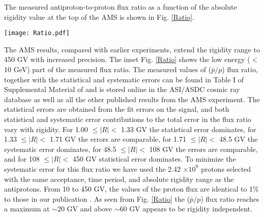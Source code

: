\documentclass[twocolumn,twoside,slac_two]{revtex4-1}
\begin{document}
The measured antiproton-to-proton flux ratio
as a function of the absolute rigidity value at the top of the AMS
is shown in Fig. \ref{Ratio}. 
\begin{figure*}[t]
\centering
\texttt{[image: Ratio.pdf]}
\caption{The measured ($\bar{p}/p$) flux ratio as a function of the
  absolute value of the rigidity from 1 to 450 GV. The PAMELA \cite{ref:PAMELA}
  measurement is also shown (blue open circle).
  In the inset the ($\bar{p}/p$) flux ratio it is shown as a function of the kinetic energy up to 10 GeV.
  The kinetic energy is defined as $E_K = \sqrt{R^2 +M^2}-M$ where M is the antiproton or proton mass.
  The BESS \cite{ref:BESS} and PAMELA \cite{ref:PAMELA} measurements are also shown. For the AMS data, the error bars are
  the quadratic sum of statistical and systematic errors. Horizontally, the data points are placed at
the center of each bin. See \cite{ref:AMS2_pbar}.} \label{Ratio}
\end{figure*}
The AMS results,
compared with earlier experiments,
extend the rigidity range to 450 GV with increased
precision.
The inset Fig. \ref{Ratio} shows the low energy ($<$ 10 GeV) part of the measured flux ratio.
The measured values of ($\bar{p}/p$) flux ratio, together with the statistical and systematic
errors can be found in Table I of Supplemental Material of \cite{ref:AMS2_pbar} and
is stored online in the ASI/ASDC cosmic ray database \cite{ref:ASDC} as well as all
the other published results from the AMS experiment.
%
The statistical errors are obtained from the fit errors on the signal, and
both statistical and systematic error contributions to the total error in the
flux ratio vary with rigidity.
For 1.00 $\leq \vert R \vert <$ 1.33 GV the statistical error
dominates, for 1.33 $\leq \vert R \vert <$ 1.71 GV the errors are comparable,
for 1.71 $\leq \vert R \vert <$ 48.5 GV the systematic error dominates,
for 48.5 $\leq \vert R \vert <$ 108 GV the errors are comparable,
and for 108 $\leq \vert R \vert <$ 450 GV statistical error dominates.
%
To minimize the systematic error for this flux ratio we have used the 2.42 $\times 10^9$
protons selected with the same acceptance, time period, and absolute rigidity range
as the antiprotons. From 10 to 450 GV, the values of the
proton flux are identical to 1$\%$ to those in our publication
\cite{ref:AMS2_protons}.
As seen from Fig. \ref{Ratio} the ($\bar{p}/p$) flux ratio reaches a maximum at $\sim 20$ GV and above $\sim$60  GV appears to be rigidity independent.
\end{document}
